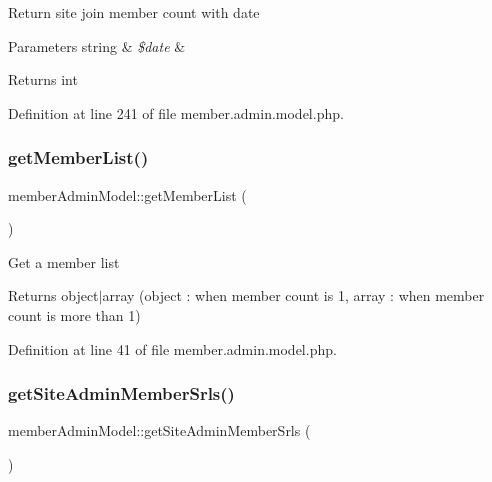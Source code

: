 Return site join member count with date


\begin{DoxyParams}[1]{Parameters}
string & {\em \$date} & \\
\hline
\end{DoxyParams}
\begin{DoxyReturn}{Returns}
int 
\end{DoxyReturn}


Definition at line 241 of file member.\+admin.\+model.\+php.

\hypertarget{classmemberAdminModel_add5844ac2ed9170897363464c759f94f}{}\label{classmemberAdminModel_add5844ac2ed9170897363464c759f94f} 
\subsubsection{\texorpdfstring{get\+Member\+List()}{getMemberList()}}
{\footnotesize\ttfamily member\+Admin\+Model\+::get\+Member\+List (\begin{DoxyParamCaption}{ }\end{DoxyParamCaption})}

Get a member list

\begin{DoxyReturn}{Returns}
object$\vert$array (object \+: when member count is 1, array \+: when member count is more than 1) 
\end{DoxyReturn}


Definition at line 41 of file member.\+admin.\+model.\+php.

\hypertarget{classmemberAdminModel_a2ae855f2db9aa8c5fc821a2de9d766e9}{}\label{classmemberAdminModel_a2ae855f2db9aa8c5fc821a2de9d766e9} 
\subsubsection{\texorpdfstring{get\+Site\+Admin\+Member\+Srls()}{getSiteAdminMemberSrls()}}
{\footnotesize\ttfamily member\+Admin\+Model\+::get\+Site\+Admin\+Member\+Srls (\begin{DoxyParamCaption}{ }\end{DoxyParamCaption})}

